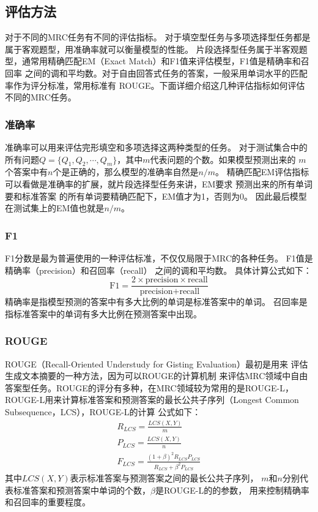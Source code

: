 \subsection{评估方法}
对于不同的MRC任务有不同的评估指标。
对于填空型任务与多项选择型任务都是属于客观题型，用准确率就可以衡量模型的性能。
片段选择型任务属于半客观题型，通常用精确匹配EM（Exact Match）和F1值来评估模型，F1值是精确率和召回率
之间的调和平均数。对于自由回答式任务的答案，一般采用单词水平的匹配率作为评分标准，常用标准有
ROUGE。下面详细介绍这几种评估指标如何评估不同的MRC任务。
\subsubsection{准确率}
准确率可以用来评估完形填空和多项选择这两种类型的任务。
对于测试集合中的所有问题$Q=\{Q_1,Q_2,\cdots,Q_m\}$，其中$m$代表问题的个数。如果模型预测出来的
$m$个答案中有$n$个是正确的，那么模型的准确率自然是$n/m$。
精确匹配EM评估指标可以看做是准确率的扩展，就片段选择型任务来讲，EM要求
预测出来的所有单词要和标准答案
的所有单词要精确匹配下，EM值才为1，否则为0。
因此最后模型在测试集上的EM值也就是$n/m$。
\subsubsection{F1}
F1分数是最为普遍使用的一种评估标准，不仅仅局限于MRC的各种任务。
F1值是精确率（precision）和召回率（recall）
之间的调和平均数。
具体计算公式如下：
\begin{equation}
    \text{F1}=\displaystyle\frac{2\times\text{precision}\times\text{recall}}{\text{precision}+\text{recall}}
\end{equation}
精确率是指模型预测的答案中有多大比例的单词是标准答案中的单词。
召回率是指标准答案中的单词有多大比例在预测答案中出现。

\subsubsection{ROUGE}
ROUGE（Recall-Oriented Understudy for Gisting Evaluation）最初是用来
评估生成文本摘要的一种方法，因为可以ROUGE的计算机制
来评估MRC领域中自由答案型任务。ROUGE的评分有多种，在MRC领域较为常用的是ROUGE-L，
ROUGE-L用来计算标准答案和预测答案的最长公共子序列（Longest Common Subsequence，LCS），ROUGE-L的计算
公式如下：
\begin{gather}
    R_{LCS}=\displaystyle\frac{LCS(X,Y)}{m} \\
    P_{LCS}=\displaystyle\frac{LCS(X,Y)}{n} \\
    F_{LCS}=\displaystyle\frac{{(1+\beta)}^2R_{LCS}P_{LCS}}{R_{LCS}+\beta^2P_{LCS}}
\end{gather}
其中$LCS(X,Y)$表示标准答案与预测答案之间的最长公共子序列，
$m$和$n$分别代表标准答案和预测答案中单词的个数，$\beta$是ROUGE-L的的参数，
用来控制精确率和召回率的重要程度。








